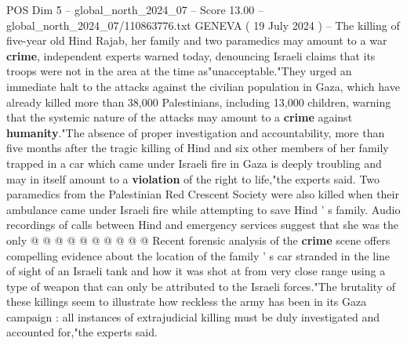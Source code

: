 \begin{textsample}{POS Dim 5 – global\_north\_2024\_07 – Score 13.00 – global\_north\_2024\_07/110863776.txt}  \label{ex:f5_pos_309}
GENEVA ( 19 July 2024 ) -- The killing of five-year old Hind Rajab, her family and two paramedics may amount to a war \textbf{crime}, independent experts warned today, denouncing Israeli claims that its troops were not in the area at the time as"unacceptable."They urged an immediate halt to the attacks against the civilian population in Gaza, which have already killed more than 38,000 Palestinians, including 13,000 children, warning that the systemic nature of the attacks may amount to a \textbf{crime} against \textbf{humanity}."The absence of proper investigation and accountability, more than five months after the tragic killing of Hind and six other members of her family trapped in a car which came under Israeli fire in Gaza is deeply troubling and may in itself amount to a \textbf{violation} of the right to life,"the experts said.
Two paramedics from the Palestinian Red Crescent Society were also killed when their ambulance came under Israeli fire while attempting to save Hind ' s family.
Audio recordings of calls between Hind and emergency services suggest that she was the only @ @ @ @ @ @ @ @ @ @ Recent forensic analysis of the \textbf{crime} scene offers compelling evidence about the location of the family ' s car stranded in the line of sight of an Israeli tank and how it was shot at from very close range using a type of weapon that can only be attributed to the Israeli forces."The brutality of these killings seem to illustrate how reckless the army has been in its Gaza campaign : all instances of extrajudicial killing must be duly investigated and accounted for,"the experts said.

\end{textsample}
